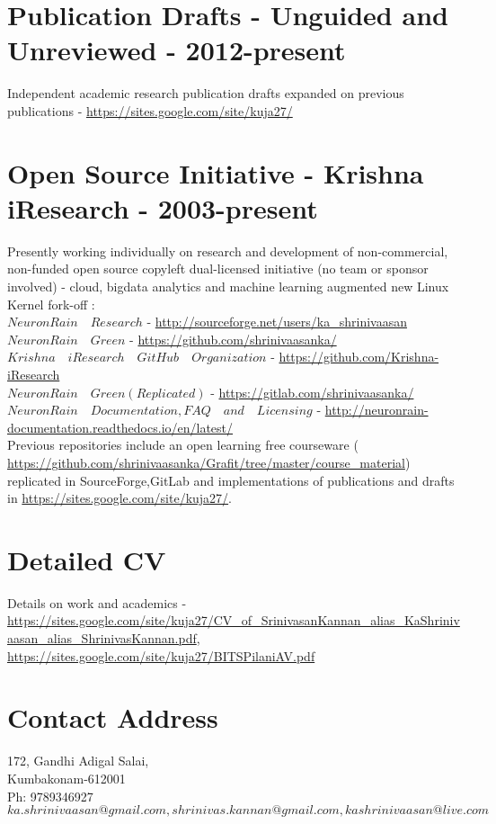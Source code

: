 \documentclass[11pt,onecolumn]{article}
\begin{document}
\section{Publication Drafts - Unguided and Unreviewed - 2012-present}
Independent academic research publication drafts expanded on previous publications - \url {https://sites.google.com/site/kuja27/}

\section{Open Source Initiative - Krishna iResearch - 2003-present}
Presently working individually on research and development of non-commercial, non-funded open source copyleft dual-licensed initiative (no team or sponsor involved) - cloud, bigdata analytics and machine learning augmented new Linux Kernel fork-off $:$ \\
 $NeuronRain \quad Research$ - \url {http://sourceforge.net/users/ka_shrinivaasan} \\
 $NeuronRain \quad Green$ - \url {https://github.com/shrinivaasanka/} \\
 $Krishna \quad iResearch \quad GitHub \quad Organization$ - \url {https://github.com/Krishna-iResearch} \\
  $NeuronRain \quad Green (Replicated)$ - \url {https://gitlab.com/shrinivaasanka/} \\
 $NeuronRain \quad Documentation, FAQ \quad and \quad Licensing$ - \url {http://neuronrain-documentation.readthedocs.io/en/latest/} \\
Previous repositories include an open learning free courseware ( \url {https://github.com/shrinivaasanka/Grafit/tree/master/course_material})  replicated in SourceForge,GitLab and implementations of publications and drafts in \url {https://sites.google.com/site/kuja27/}.

\section{Detailed CV}
Details on work and academics - \url {https://sites.google.com/site/kuja27/CV\_of\_SrinivasanKannan\_alias\_KaShrinivaasan\_alias\_ShrinivasKannan.pdf}, \url {https://sites.google.com/site/kuja27/BITSPilaniAV.pdf}

\section{Contact Address}
172, Gandhi Adigal Salai, \\
Kumbakonam-612001 \\
Ph: 9789346927 \\
$ka.shrinivaasan@gmail.com, shrinivas.kannan@gmail.com, kashrinivaasan@live.com$ 
\end{document}

